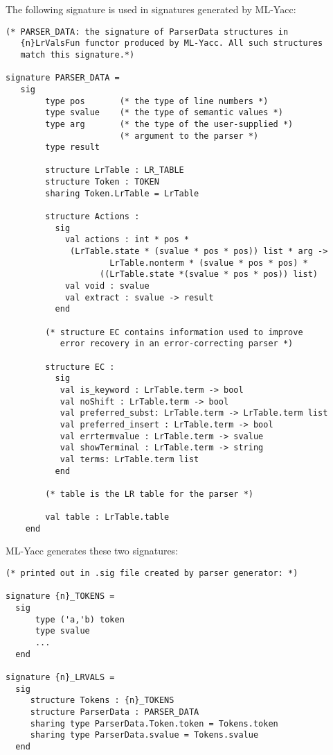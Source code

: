 The following signature is used in signatures generated by
ML-Yacc:
\begin{tt}
\begin{verbatim}
(* PARSER_DATA: the signature of ParserData structures in
   {n}LrValsFun functor produced by ML-Yacc. All such structures
   match this signature.*)

signature PARSER_DATA =
   sig
        type pos       (* the type of line numbers *)
        type svalue    (* the type of semantic values *)
        type arg       (* the type of the user-supplied *)
                       (* argument to the parser *)
        type result

        structure LrTable : LR_TABLE
        structure Token : TOKEN
        sharing Token.LrTable = LrTable

        structure Actions : 
          sig
            val actions : int * pos *
             (LrTable.state * (svalue * pos * pos)) list * arg ->
                     LrTable.nonterm * (svalue * pos * pos) *
                   ((LrTable.state *(svalue * pos * pos)) list)
            val void : svalue
            val extract : svalue -> result
          end

        (* structure EC contains information used to improve
           error recovery in an error-correcting parser *)

        structure EC :
          sig
           val is_keyword : LrTable.term -> bool
           val noShift : LrTable.term -> bool
           val preferred_subst: LrTable.term -> LrTable.term list
           val preferred_insert : LrTable.term -> bool
           val errtermvalue : LrTable.term -> svalue
           val showTerminal : LrTable.term -> string
           val terms: LrTable.term list
          end

        (* table is the LR table for the parser *)

        val table : LrTable.table
    end
\end{verbatim}
\end{tt}

ML-Yacc generates these two signatures:
\begin{tt}
\begin{verbatim}
(* printed out in .sig file created by parser generator: *)

signature {n}_TOKENS = 
  sig
      type ('a,'b) token
      type svalue
      ...
  end

signature {n}_LRVALS =
  sig
     structure Tokens : {n}_TOKENS
     structure ParserData : PARSER_DATA
     sharing type ParserData.Token.token = Tokens.token
     sharing type ParserData.svalue = Tokens.svalue
  end
\end{verbatim}
\end{tt}
